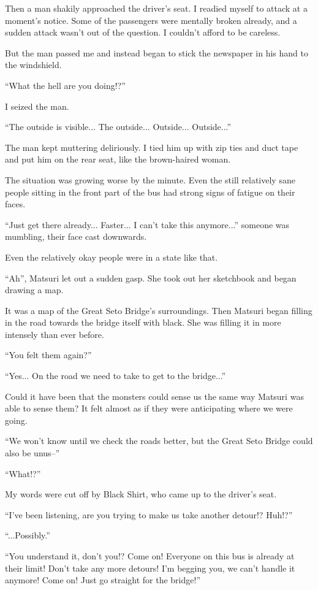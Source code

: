 Then a man shakily approached the driver's seat. I readied myself to attack at a moment's notice. Some of the passengers were mentally broken already, and a sudden attack wasn't out of the question. I couldn't afford to be careless.

But the man passed me and instead began to stick the newspaper in his hand to the windshield.

``What the hell are you doing!?''

I seized the man.

``The outside is visible... The outside... Outside... Outside...''

The man kept muttering deliriously. I tied him up with zip ties and duct tape and put him on the rear seat, like the brown-haired woman.

The situation was growing worse by the minute. Even the still relatively sane people sitting in the front part of the bus had strong signs of fatigue on their faces.

``Just get there already... Faster... I can't take this anymore...'' someone was mumbling, their face cast downwards.

Even the relatively okay people were in a state like that.

``Ah'', Matsuri let out a sudden gasp. She took out her sketchbook and began drawing a map.

It was a map of the Great Seto Bridge's surroundings. Then Matsuri began filling in the road towards the bridge itself with black. She was filling it in more intensely than ever before.

``You felt them again?''

``Yes... On the road we need to take to get to the bridge...''

Could it have been that the monsters could sense us the same way Matsuri was able to sense them? It felt almost as if they were anticipating where we were going.

``We won't know until we check the roads better, but the Great Seto Bridge could also be unus--''

``What!?''

My words were cut off by Black Shirt, who came up to the driver's seat.

``I've been listening, are you trying to make us take another detour!? Huh!?''

``...Possibly.''

``You understand it, don't you!? Come on! Everyone on this bus is already at their limit! Don't take any more detours! I'm begging you, we can't handle it anymore! Come on! Just go straight for the bridge!''

